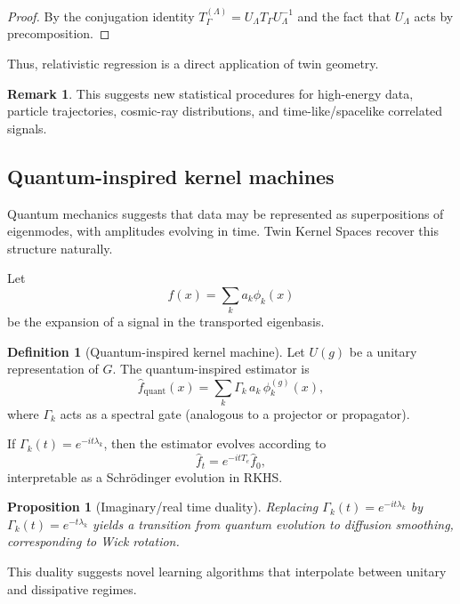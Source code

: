 \documentclass[11pt]{article}
\newtheorem{proposition}[theorem]{Proposition}
\theoremstyle{definition}
\newtheorem{definition}[theorem]{Definition}
\newtheorem{remark}[theorem]{Remark}
\begin{document}
\begin{proof}
	By the conjugation identity $T_\Gamma^{(\Lambda)} = U_\Lambda T_\Gamma U_\Lambda^{-1}$ and the fact that $U_\Lambda$ acts by precomposition.
\end{proof}

Thus, relativistic regression is a direct application of twin geometry.

\begin{remark}
	This suggests new statistical procedures for high-energy data, particle trajectories, cosmic-ray distributions, and time-like/spacelike correlated signals.
\end{remark}

\subsection{Quantum-inspired kernel machines}

Quantum mechanics suggests that data may be represented as superpositions of eigenmodes, with amplitudes evolving in time.
Twin Kernel Spaces recover this structure naturally.

Let
\[
f(x)=\sum_k a_k \phi_k(x)
\]
be the expansion of a signal in the transported eigenbasis.

\begin{definition}[Quantum-inspired kernel machine]
	Let $U(g)$ be a unitary representation of $G$.
	The quantum-inspired estimator is
	\[
	\widehat f_{\mathrm{quant}}(x)
	= \sum_k \Gamma_k\,a_k\, \phi_k^{(g)}(x),
	\]
	where $\Gamma_k$ acts as a spectral gate (analogous to a projector or propagator).
\end{definition}

If $\Gamma_k(t)=e^{-it\lambda_k}$, then the estimator evolves according to
\[
\widehat f_t = e^{-it T_e}\widehat f_0,
\]
interpretable as a Schrödinger evolution in RKHS.

\begin{proposition}[Imaginary/real time duality]
	Replacing $\Gamma_k(t)=e^{-it\lambda_k}$ by $\Gamma_k(t)=e^{-t\lambda_k}$ yields a transition from quantum evolution to diffusion smoothing, corresponding to Wick rotation.
\end{proposition}

This duality suggests novel learning algorithms that interpolate between unitary and dissipative regimes.
\end{document}
